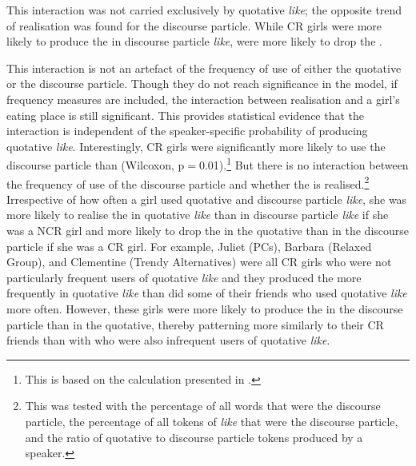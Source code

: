 

This interaction was not carried exclusively by quotative \textit{like}; the opposite trend of  realisation was found for the discourse particle. While CR girls were more likely to produce the  in discourse particle \textit{like},  were more likely to drop the .

This interaction is not an artefact of the frequency of use of either the quotative or the discourse particle. Though they do not reach significance in the model, if frequency measures are included, the interaction between  realisation and a girl's eating place is still significant. This provides statistical evidence that the interaction is independent of the speaker-specific probability of producing quotative \textit{like}. Interestingly, CR girls were significantly more likely to use the discourse particle than  (Wilcoxon, p$=$0.01).\footnote{This is based on the calculation presented in .} But there is no interaction between the frequency of use of the discourse particle and whether the  is realised.\footnote{This was tested with the percentage of all words that were the discourse particle, the percentage of all tokens of \textit{like} that were the discourse particle, and the ratio of quotative to discourse particle tokens produced by a speaker.} Irrespective of how often a girl used quotative and discourse particle \textit{like}, she was more likely to realise the  in quotative \textit{like} than in discourse particle \textit{like} if she was a NCR girl and more likely to drop the  in the quotative than in the discourse particle if she was a CR girl. For example, Juliet (PCs), Barbara (Relaxed Group), and Clementine (Trendy Alternatives) were all CR girls who were not particularly frequent users of quotative \textit{like} and they produced the  more frequently in quotative \textit{like} than did some of their friends who used quotative \textit{like} more often. However, these girls were more likely to produce the  in the discourse particle than in the quotative, thereby patterning more similarly to their CR friends than with  who were also infrequent users of quotative \textit{like}. 



